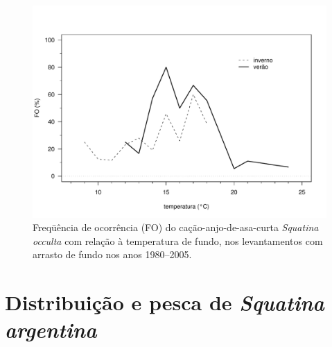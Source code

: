 \documentclass[a4paper,11pt,twoside,showtrims,onecolumn,openright,final]{memoir}
\begin{document}
\begin{figure}
\begin{center}
\includegraphics[width=\textwidth]{OCCULTA_DISTRIBTEMPFUNDO}
\end{center}
\caption[Freqüência de ocorrência (FO) do cação-anjo-de-asa-curta \emph{Squatina occulta}
	 com relação à temperatura de fundo]
	{Freqüência de ocorrência (FO) do cação-anjo-de-asa-curta \emph{Squatina occulta}
	 com relação à temperatura de fundo, nos levantamentos com 
	 arrasto de fundo nos anos 1980--2005.}
\label{fig:occulta-distrib-tempfundo}
\end{figure}


\section*{Distribuição e pesca de  \emph{Squatina argentina}}
\end{document}
